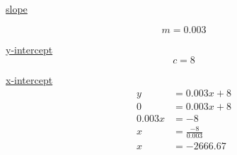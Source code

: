 \documentclass{article}
\begin{document}
\underline{slope}

$$
    m=0.003
$$

\underline{y-intercept}
$$
    c = 8
$$

\underline{x-intercept}
$$
    \begin{aligned}
        y      & = 0.003x + 8       \\
        0      & = 0.003x + 8       \\
        0.003x & = -8               \\
        x      & = \frac{-8}{0.003} \\
        x      & = -2666.67         \\
    \end{aligned}
$$
\end{document}
